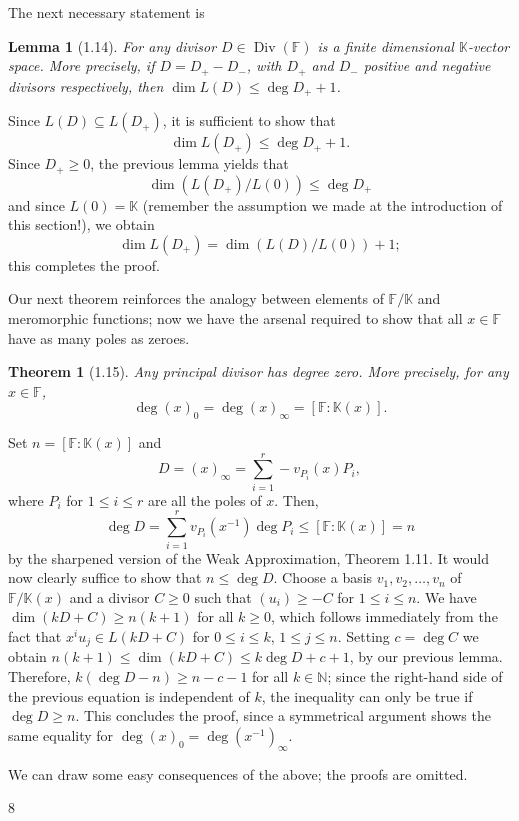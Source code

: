 \documentclass[11pt]{article}
\makeatletter
\theoremstyle{scplain}
\newtheorem*{lemma}{Lemma}
\newtheorem*{theorem}{Theorem}
\renewenvironment{proof}[1][\proofname]{%
  \par\pushQED{\qed}\normalfont\topsep6\p@\@plus6\p@\relax
  \trivlist\item[\hskip\labelsep\scshape #1\@addpunct{.}]\ignorespaces}%
  {\popQED\endtrivlist\@endpefalse}
\DeclareMathOperator{\Div}{Div}
\makeatother
\begin{document}
The next necessary statement is

\begin{lemma}[1.14]
For any divisor $D \in \Div(\mathbb{F})$ is a finite dimensional
$\mathbb{K}$-vector space. More precisely, if $D = D_+ - D_-$, with $D_+$ and
$D_-$ positive and negative divisors respectively, then
$\dim L(D) \leq \deg D_+ + 1$.
\end{lemma}

\begin{proof}
Since $L(D) \subseteq L(D_+)$, it is sufficient to show that
\[
  \dim L(D_+) \leq \deg D_+ + 1.
\]
Since $D_+ \geq 0$, the previous lemma yields that
\[
  \dim(L(D_+)/L(0)) \leq \deg D_+
\]
and since $L(0) = \mathbb{K}$ (remember the assumption we made at the
introduction of this section!), we obtain
\[
  \dim L(D_+) = \dim(L(D)/L(0)) + 1;
\]
this completes the proof.
\end{proof}

Our next theorem reinforces the analogy between elements of
$\mathbb{F}/\mathbb{K}$ and meromorphic functions; now we have the arsenal
required to show that all $x \in \mathbb{F}$ have as many poles as zeroes.

\begin{theorem}[1.15]
Any principal divisor has degree zero. More precisely, for any
$x \in \mathbb{F}$,
\[
  \deg(x)_0 = \deg(x)_\infty = [\mathbb{F} : \mathbb{K}(x)].
\]
\end{theorem}

\begin{proof}
Set $n = [\mathbb{F} : \mathbb{K}(x)]$ and
\[
  D = (x)_\infty = \sum_{i=1}^{r} -v_{P_i}(x)P_i,
\]
where $P_i$ for $1 \leq i \leq r$ are all the poles of $x$. Then,
\[
  \deg D = \sum_{i=1}^{r} v_{P_i}(x^{-1})\deg P_i
    \leq [\mathbb{F} : \mathbb{K}(x)] = n
\]
by the sharpened version of the Weak Approximation, Theorem 1.11. It would now
clearly suffice to show that $n \leq \deg D$. Choose a basis
$v_1, v_2, \ldots, v_n$ of $\mathbb{F}/\mathbb{K}(x)$ and a divisor $C \geq 0$
such that $(u_i) \geq -C$ for $1 \leq i \leq n$. We have
$\dim(kD+C) \geq n(k+1)$ for all $k \geq 0$, which follows immediately from the
fact that $x^i u_j \in L(kD+C)$ for $0 \leq i \leq k$, $1 \leq j \leq n$.
Setting $c = \deg C$ we obtain
$n(k+1) \leq \dim(kD+C) \leq k\deg D+c+1$, by our previous lemma. Therefore,
$k(\deg D-n) \geq n-c-1$ for all $k \in \mathbb{N}$; since the right-hand side
of the previous equation is independent of $k$, the inequality can only be true
if $\deg D \geq n$. This concludes the proof, since a symmetrical argument shows
the same equality for $\deg(x)_0 = \deg(x^{-1})_\infty$.
\end{proof}

We can draw some easy consequences of the above; the proofs are omitted.

\begin{center}8\end{center}
\end{document}
